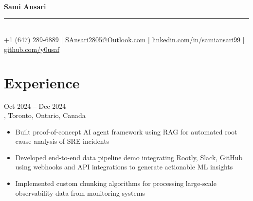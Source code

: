 \documentclass[letterpaper,10pt]{article}
\begin{document}
\begin{center}
{\LARGE\bfseries Sami Ansari} \\
\vspace{1pt}
{\rule{0.3\textwidth}{0.5pt}} \\
\vspace{4pt}
\small +1 (647) 289-6889 \enspace | \enspace \href{mailto:SAnsari2805@Outlook.com}{SAnsari2805@Outlook.com} \enspace | \enspace \href{https://linkedin.com/in/samiansari99/}{linkedin.com/in/samiansari99} \enspace | \enspace \href{https://github.com/y0usaf}{github.com/y0usaf}
\end{center}
\vspace{-4pt}

\section{Experience}

\hspace{0.15in}{\large\bfseries AI Engineer (Contract)} \hfill {\small Oct 2024 -- Dec 2024} \\
\hspace{0.15in}{\bfseries Rootly}, Toronto, Ontario, Canada
\vspace{-1pt}
\begin{itemize}[leftmargin=0.35in, itemsep=-1pt, topsep=1pt, labelsep=0.035in]
\item Built proof-of-concept AI agent framework using RAG for automated root cause analysis of SRE incidents
\item Developed end-to-end data pipeline demo integrating Rootly, Slack, GitHub using webhooks and API integrations to generate actionable ML insights
\item Implemented custom chunking algorithms for processing large-scale observability data from monitoring systems
\end{itemize}
\vspace{1pt}
\end{document}
